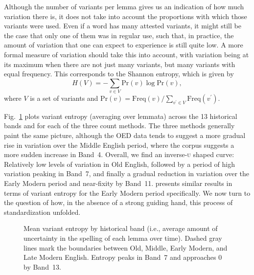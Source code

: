 \documentclass[doc,biblatex]{apa7}
\begin{document}
Although the number of variants per lemma gives us an indication of how much variation there is, it does not take into account the proportions with which those variants were used. Even if a word has many attested variants, it might still be the case that only one of them was in regular use, such that, in practice, the amount of variation that one can expect to experience is still quite low. A more formal measure of variation should take this into account, with variation being at its maximum when there are not just many variants, but many variants with equal frequency. This corresponds to the Shannon entropy, which is given by
\begin{equation}
H(V) = -\sum_{v \in V} \mathrm{Pr}(v) \log \mathrm{Pr}(v),
\end{equation}
where $V$ is a set of variants and $\mathrm{Pr}(v) = \mathrm{Freq}(v) / \sum_{v^\prime \in V} \mathrm{Freq}(v^\prime)$. 

Fig.~\ref{entropy_plot} plots variant entropy (averaging over lemmata) across the 13 historical bands and for each of the three count methods. The three methods generally paint the same picture, although the OED data tends to suggest a more gradual rise in variation over the Middle English period, where the corpus suggests a more sudden increase in Band~4. Overall, we find an inverse-\textsc{u} shaped curve: Relatively low levels of variation in Old English, followed by a period of high variation peaking in Band~7, and finally a gradual reduction in variation over the Early Modern period and near-fixity by Band~11. \textcite{Kupkova:2023} presents similar results in terms of variant entropy for the Early Modern period specifically. We now turn to the question of how, in the absence of a strong guiding hand, this process of standardization unfolded.

	\begin{figure}
	\vspace*{2pt}
	\caption{Mean variant entropy by historical band (i.e., average amount of uncertainty in the spelling of each lemma over time). Dashed gray lines mark the boundaries between Old, Middle, Early Modern, and Late Modern English. Entropy peaks in Band~7 and approaches 0 by Band~13.}
	\label{entropy_plot}
	\end{figure}
\end{document}
